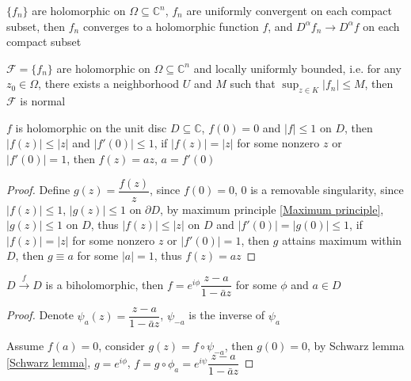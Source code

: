 \documentclass[main]{subfiles}
\begin{document}
\begin{corollary}

\end{corollary}

\begin{theorem}\label{Maximum principle}

\end{theorem}

\begin{theorem}
$\{f_n\}$ are holomorphic on $\Omega\subseteq\mathbb C^n$, $f_n$ are uniformly convergent on each compact subset, then $f_n$ converges to a holomorphic function $f$, and $D^\alpha f_n\to D^\alpha f$ on each compact subset
\end{theorem}

\begin{theorem}\label{Montel's theorem}
$\mathcal F=\{f_n\}$ are holomorphic on $\Omega\subseteq\mathbb C^n$ and locally uniformly bounded, i.e. for any $z_0\in\Omega$, there exists a neighborhood $U$ and $M$ such that $\displaystyle\sup_{z\in K}|f_n|\leq M$, then $\mathcal F$ is normal
\end{theorem}

\begin{lemma}\label{Schwarz lemma}
$f$ is holomorphic on the unit disc $D\subseteq\mathbb C$, $f(0)=0$ and $|f|\leq1$ on $D$, then $|f(z)|\leq|z|$ and $|f'(0)|\leq1$, if $|f(z)|=|z|$ for some nonzero $z$ or $|f'(0)|=1$, then $f(z)=az$, $a=f'(0)$
\end{lemma}

\begin{proof}
Define $g(z)=\dfrac{f(z)}{z}$, since $f(0)=0$, $0$ is a removable singularity, since $|f(z)|\leq1$, $|g(z)|\leq1$ on $\partial D$, by maximum principle \ref{Maximum principle}, $|g(z)|\leq1$ on $D$, thus $|f(z)|\leq|z|$ on $D$ and $|f'(0)|=|g(0)|\leq1$, if $|f(z)|=|z|$ for some nonzero $z$ or $|f'(0)|=1$, then $g$ attains maximum within $D$, then $g\equiv a$ for some $|a|=1$, thus $f(z)=az$
\end{proof}

\begin{corollary}
$D\xrightarrow fD$ is a biholomorphic, then $f=e^{i\phi}\dfrac{z-a}{1-\bar az}$ for some $\phi$ and $a\in D$
\end{corollary}

\begin{proof}
Denote $\psi_a(z)=\dfrac{z-a}{1-\bar az}$, $\psi_{-a}$ is the inverse of $\psi_a$ \par
Assume $f(a)=0$, consider $g(z)=f\circ\psi_{-a}$, then $g(0)=0$, by Schwarz lemma \ref{Schwarz lemma}, $g=e^{i\phi}$, $f=g\circ\phi_a=e^{i\psi}\dfrac{z-a}{1-\bar az}$
\end{proof}
\end{document}
